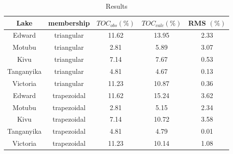 \documentclass[aspectratio=169]{beamer} %
\begin{document}
{{{{{{{{{{{
{
\begin{frame}
	\footnotesize
	\begin{table}
		\caption{Results} %
		\centering
		\begin{tabular}{c| c| c c c} 
			\hline\hline %
			Lake & membership & $TOC_{obs} (\%)$ & $TOC_{calc} (\%)$ & RMS $(\%)$\\ [0.5ex] %
			\hline %
			Edward & triangular & 11.62 & 13.95  & 2.33  \\ 
			Motubu & triangular & 2.81  & 5.89   & 3.07  \\
			Kivu   & triangular & 7.14  & 7.67   & 0.53  \\
		Tanganyika & triangular & 4.81  & 4.67   & 0.13  \\
		Victoria   & triangular & 11.23 & 10.87  & 0.36  \\
		\hline
		    Edward & trapezoidal & 11.62 & 15.24  & 3.62  \\ 
			Motubu & trapezoidal & 2.81  & 5.15   & 2.34  \\
			Kivu   & trapezoidal & 7.14  & 10.72  & 3.58  \\
		Tanganyika & trapezoidal & 4.81  & 4.79   & 0.01  \\
		Victoria   & trapezoidal & 11.23 & 10.14  & 1.08  \\[1ex] %
			\hline %
		\end{tabular}
		\label{lakesdatabase} %
	\end{table} 



\end{frame}}}}}}}}}}}}}
\end{document}
